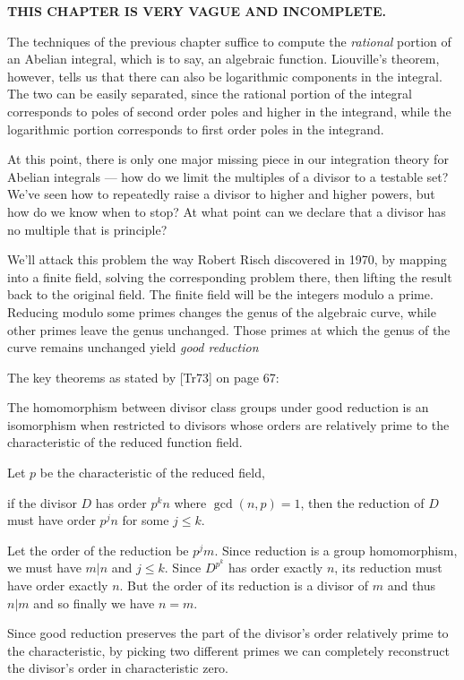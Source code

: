 

{\bf THIS CHAPTER IS VERY VAGUE AND INCOMPLETE.}

The techniques of the previous chapter suffice to compute the {\it
rational} portion of an Abelian integral, which is to say, an
algebraic function.  Liouville's theorem, however, tells us that there
can also be logarithmic components in the integral.  The two can be
easily separated, since the rational portion of the integral
corresponds to poles of second order poles and higher in the integrand,
while the logarithmic portion corresponds to first order poles
in the integrand.


At this point, there is only one major missing piece in our
integration theory for Abelian integrals --- how do we limit the
multiples of a divisor to a testable set?  We've seen how to
repeatedly raise a divisor to higher and higher powers, but how do we
know when to stop?  At what point can we declare that a divisor has no
multiple that is principle?

We'll attack this problem the way Robert Risch discovered in 1970, by
mapping into a finite field, solving the corresponding problem there,
then lifting the result back to the original field.  The finite field
will be the integers modulo a prime.  Reducing modulo some primes
changes the genus of the algebraic curve, while other primes leave the
genus unchanged.  Those primes at which the genus of the curve remains
unchanged yield {\it good reduction}

The key theorems as stated by [Tr73] on page 67:

\theorem
The homomorphism between divisor class groups under good reduction
is an isomorphism when restricted to divisors whose orders are
relatively prime to the characteristic of the reduced function field.
\endtheorem

Let $p$ be the characteristic of the reduced field,

\theorem
if the divisor $D$ has order $p^k n$ where $\gcd(n,p)=1$, then
the reduction of $D$ must have order $p^j n$ for some $j\le k$.

\proof
Let the order of the reduction be $p^j m$.  Since reduction
is a group homomorphism, we must have $m|n$ and $j \le k$.
Since $D^{p^k}$ has order exactly $n$, its reduction
must have order exactly $n$.  But the order of its
reduction is a divisor of $m$ and thus $n|m$ and so
finally we have $n=m$.

\endtheorem


Since good reduction preserves the part of the divisor's order
relatively prime to the characteristic, by picking two different
primes we can completely reconstruct the divisor's order in
characteristic zero.

